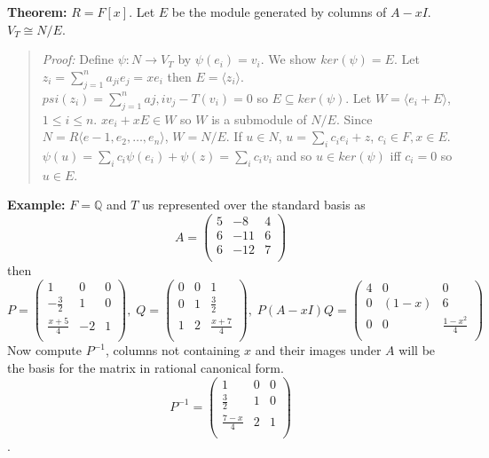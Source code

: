 \\
\\
{\bf Theorem:} $R=F[x]$.  Let $E$ be the module generated by columns of $A-xI$.  $V_T \cong N/E$.
\begin{quote}
\emph{Proof:} 
Define $\psi: N \rightarrow V_T$ by $\psi(e_i)=v_i$.  
We show $ker(\psi)=E$. 
Let $z_i = \sum_{j=1}^n a_{ji}e_j =xe_i$ then $E= \langle z_i \rangle$.
$psi(z_i) = \sum_{j=1}^n a{j,i}v_j - T(v_i)= 0$ so $E \subseteq ker(\psi)$.
Let $W = \langle e_i + E \rangle$, $1 \leq i \leq n$.  $x e_i + xE \in W$ so $W$ is a submodule of $N/E$.
Since $N= R \langle e-1 , e_2 , \ldots , e_n \rangle$, $W= N/E$.  If $u \in N$, $u = \sum_i c_i e_i + z$, $c_i \in F, x \in E$.
$\psi(u)=  \sum_i c_i \psi(e_i) + \psi(z) = \sum_i c_i v_i$ and so $u \in ker(\psi)$ iff $c_i =0$ so $u \in E$.
\end{quote}
{\bf Example:} $F = \mathbb{Q}$ and $T$ us represented over the standard basis as
$$
A =
\left(
\begin{array}{ccc}
5 & -8 & 4\\
6 & -11& 6\\
6 & -12& 7\\
\end{array}
\right)
$$
then
$$
P =
\left(
\begin{array}{ccc}
1 & 0 & 0\\
-{\frac 3 2} & 1 & 0\\
{\frac {x+5} 4} & -2& 1\\
\end{array}
\right),\;
Q =
\left(
\begin{array}{ccc}
0 & 0 & 1\\
0 & 1& {\frac 3 2}\\
1 & 2& {\frac {x+7} 4}\\
\end{array}
\right),\;
P(A-xI)Q =
\left(
\begin{array}{ccc}
4 & 0 & 0\\
0 & (1-x) & 6\\
0 & 0& {\frac {1-x^2} 4} \\
\end{array}
\right)
$$
Now compute $P^{-1}$, columns not containing $x$ and their images under $A$ will be the basis for the matrix in rational canonical form.
$$
P^{-1} =
\left(
\begin{array}{ccc}
1 & 0 & 0\\
{\frac 3 2} & 1 & 0\\
{\frac {7-x} 4}  & 2& 1\\
\end{array}
\right)
$$.
